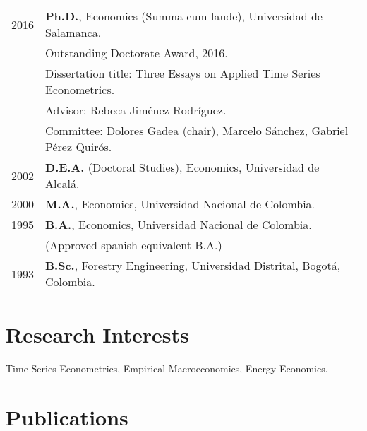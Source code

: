 \documentclass[11pt]{article}\usepackage[]{graphicx}\usepackage[]{color}
\begin{document}
\begin{tabular}{rl{-2cm}} %

2016 & \textbf{Ph.D.}, Economics (Summa cum laude), Universidad de Salamanca.\\
\vspace{1pt}& Outstanding Doctorate Award, 2016.\\
\vspace{1pt}& Dissertation title: Three Essays on Applied Time Series Econometrics.\\
\vspace{1pt}& Advisor: Rebeca Jiménez-Rodríguez.\\
\vspace{5pt}& Committee: Dolores Gadea (chair), Marcelo Sánchez, Gabriel Pérez Quirós.\\

\vspace{5pt}2002 & \textbf{D.E.A.} (Doctoral Studies), Economics, Universidad de Alcalá.\\

\vspace{5pt}2000 & \textbf{M.A.}, Economics, Universidad Nacional de Colombia.\\

1995 & \textbf{B.A.}, Economics, Universidad Nacional de Colombia.\\
\vspace{5pt}& (Approved spanish equivalent B.A.)\\

1993 & \textbf{B.Sc.}, Forestry Engineering, Universidad Distrital, Bogotá, Colombia.\\

\end{tabular}
\vspace{10pt}

\section{Research Interests}

Time Series Econometrics, Empirical Macroeconomics, Energy Economics.
\vspace{10pt}


\section{Publications}
\end{document}
